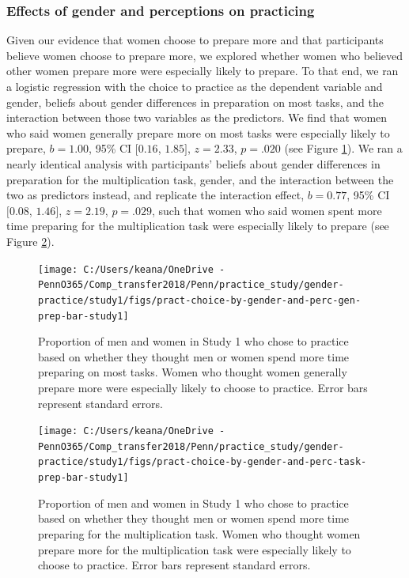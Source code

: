 \documentclass[a4paper, nobind]{templates/ociamthesis}
\begin{document}
\hypertarget{effects-of-gender-and-perceptions-on-practicing}{%
\subsubsection{Effects of gender and perceptions on practicing}\label{effects-of-gender-and-perceptions-on-practicing}}

Given our evidence that women choose to prepare more and that participants believe women choose to prepare more, we explored whether women who believed other women prepare more were especially likely to prepare. To that end, we ran a logistic regression with the choice to practice as the dependent variable and gender, beliefs about gender differences in preparation on most tasks, and the interaction between those two variables as the predictors. We find that women who said women generally prepare more on most tasks were especially likely to prepare, \(b = 1.00\), 95\% CI \([0.16\), \(1.85]\), \(z = 2.33\), \(p = .020\) (see Figure \ref{fig:pract-choice-by-gender-and-perc-gen-prep-bar-study1}). We ran a nearly identical analysis with participants' beliefs about gender differences in preparation for the multiplication task, gender, and the interaction between the two as predictors instead, and replicate the interaction effect, \(b = 0.77\), 95\% CI \([0.08\), \(1.46]\), \(z = 2.19\), \(p = .029\), such that women who said women spent more time preparing for the multiplication task were especially likely to prepare (see Figure \ref{fig:pract-choice-by-gender-and-perc-task-prep-bar-study1}).

\begin{figure}

{\centering \texttt{[image: C:/Users/keana/OneDrive - PennO365/Comp\_transfer2018/Penn/practice\_study/gender-practice/study1/figs/pract-choice-by-gender-and-perc-gen-prep-bar-study1]} 

}

\caption{Proportion of men and women in Study 1 who chose to practice based on whether they thought men or women spend more time preparing on most tasks. Women who thought women generally prepare more were especially likely to choose to practice. Error bars represent standard errors.}\label{fig:pract-choice-by-gender-and-perc-gen-prep-bar-study1}
\end{figure}

\begin{figure}

{\centering \texttt{[image: C:/Users/keana/OneDrive - PennO365/Comp\_transfer2018/Penn/practice\_study/gender-practice/study1/figs/pract-choice-by-gender-and-perc-task-prep-bar-study1]} 

}

\caption{Proportion of men and women in Study 1 who chose to practice based on whether they thought men or women spend more time preparing for the multiplication task. Women who thought women prepare more for the multiplication task were especially likely to choose to practice. Error bars represent standard errors.}\label{fig:pract-choice-by-gender-and-perc-task-prep-bar-study1}
\end{figure}
\end{document}
